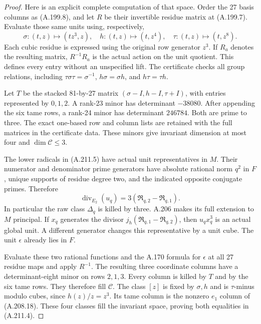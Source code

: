 \begin{proof}
Here is an explicit complete computation of that space.
Order the 27 basis columns as (A.199.8), and let \(R\) be their
invertible residue matrix at (A.199.7).  Evaluate those same units
using, respectively,
\[
 \sigma:(t,z)\mapsto(tz^3,z),\quad
 h:(t,z)\mapsto(t,z^4),\quad
 \tau:(t,z)\mapsto(t,z^8).
\tag{A.211.16}
\]
Each cubic residue is expressed using the original row generator
\(z^3\).  If \(R_a\) denotes the resulting matrix, \(R^{-1}R_a\)
is the actual action on the unit quotient.  This defines every
entry without an unspecified lift.  The certificate checks all
group relations, including \(\tau\sigma\tau=\sigma^{-1}\),
\(h\sigma=\sigma h\), and \(h\tau=\tau h\).

Let \(T\) be the stacked 81-by-27 matrix
\((\sigma-I,h-I,\tau+I)\), with entries represented by \(0,1,2\).
A rank-23 minor has determinant \(-38080\).
After appending the six tame rows, a rank-24 minor has determinant
\(246784\).  Both are prime to three.  The exact one-based row and
column lists are retained with the full matrices in the certificate
data.  These minors give invariant dimension at most four and
\(\dim\mathcal C\le3\).

The lower radicals in (A.211.5) have actual unit representatives
in \(M\).  Their numerator and denominator prime generators have
absolute rational norm \(q^2\) in \(F\), unique supports of residue
degree two, and the indicated opposite conjugate primes.  Therefore
\[
 \operatorname{div}_{E_2}(u_q)
                 =3(\mathfrak R_{q,2}-\mathfrak R_{q,1}).
\tag{A.211.17}
\]
In particular the raw class \(\Delta_q\) is killed by three.
A.206 makes its full extension to \(M\) principal.  If \(x_q\)
generates the divisor \(j_h(\mathfrak R_{q,1}-\mathfrak R_{q,2})\),
then \(u_qx_q^3\) is an actual global unit.  A different generator
changes this representative by a unit cube.  The unit \(\epsilon\)
already lies in \(F\).

Evaluate these two rational functions and the A.170 formula for
\(\epsilon\) at all 27 residue maps and apply \(R^{-1}\).
The resulting three coordinate columns have a determinant-eight
minor on rows \(2,1,3\).  Every column is killed by \(T\) and by
the six tame rows.  They therefore fill \(\mathcal C\).
The class \([z]\) is fixed by \(\sigma,h\) and is \(\tau\)-minus
modulo cubes, since \(h(z)/z=z^3\).  Its tame column is the nonzero
\(e_1\) column of (A.208.18).  These four classes fill the invariant
space, proving both equalities in (A.211.4).


\end{proof}
